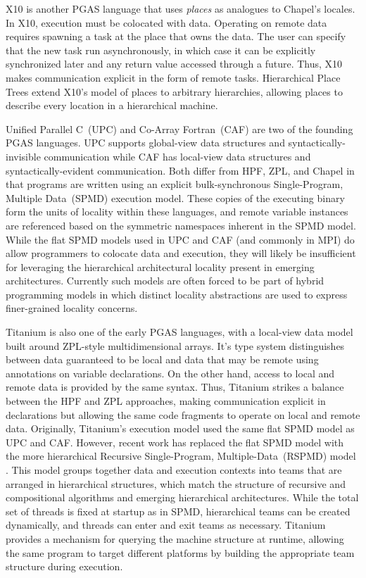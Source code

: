 X10 \cite{x10} is another PGAS language that uses \emph{places} as
analogues to Chapel's locales. In X10, execution must be colocated
with data. Operating on remote data requires spawning a task at the
place that owns the data. The user can specify that the new task run
asynchronously, in which case it can be explicitly synchronized later
and any return value accessed through a future. Thus, X10 makes
communication explicit in the form of remote tasks. Hierarchical Place
Trees \cite{hpt} extend X10's model of places to arbitrary
hierarchies, allowing places to describe every location in a
hierarchical machine.

Unified Parallel C~(UPC) and Co-Array Fortran~(CAF) are two of the
founding PGAS languages.  UPC supports global-view data structures and
syntactically-invisible communication while CAF has local-view data
structures and syntactically-evident communication.  Both differ from
HPF, ZPL, and Chapel in that programs are written using an explicit
bulk-synchronous Single-Program, Multiple Data~(SPMD) execution model.
These copies of the executing binary form the units of locality within
these languages, and remote variable instances are referenced based on
the symmetric namespaces inherent in the SPMD model. While the flat
SPMD models used in UPC and CAF (and commonly in MPI) do allow
programmers to colocate data and execution, they will likely be
insufficient for leveraging the hierarchical architectural locality
present in emerging architectures. Currently such models are often
forced to be part of hybrid programming models in which distinct
locality abstractions are used to express finer-grained locality
concerns.

Titanium \cite{titanium} is also one of the early PGAS languages, with
a local-view data model built around ZPL-style multidimensional
arrays. It's type system distinguishes between data guaranteed to be
local and data that may be remote using annotations on variable
declarations. On the other hand, access to local and remote data is
provided by the same syntax. Thus, Titanium strikes a balance between
the HPF and ZPL approaches, making communication explicit in
declarations but allowing the same code fragments to operate on local
and remote data. Originally, Titanium's execution model used the same
flat SPMD model as UPC and CAF. However, recent work has replaced the
flat SPMD model with the more hierarchical Recursive Single-Program,
Multiple-Data~(RSPMD) model \cite{kamil_lcpc13}. This model groups
together data and execution contexts into teams that are arranged in
hierarchical structures, which match the structure of recursive and
compositional algorithms and emerging hierarchical architectures.
While the total set of threads is fixed at startup as in SPMD,
hierarchical teams can be created dynamically, and threads can enter
and exit teams as necessary. Titanium provides a mechanism for
querying the machine structure at runtime, allowing the same program
to target different platforms by building the appropriate team
structure during execution.

